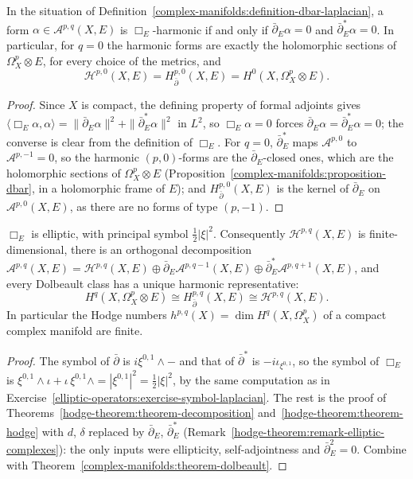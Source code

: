 \begin{lemma}\label{complex-manifolds:lemma-harmonic-closed}
In the situation of Definition~\ref{complex-manifolds:definition-dbar-laplacian}, a form $\alpha \in \mathcal{A}^{p,q}(X, E)$ is $\Box_E$-harmonic if and only if $\bar\partial_E\alpha = 0$ and $\bar\partial_E^*\alpha = 0$. In
particular, for $q = 0$ the harmonic forms are exactly the holomorphic sections of $\Omega^p_X \otimes E$, for every choice of the metrics, and
\[
\mathcal{H}^{p,0}(X, E) = H^{p,0}_{\bar\partial}(X, E) = H^0(X, \Omega^p_X \otimes E).
\]
\end{lemma}

\begin{proof}
Since $X$ is compact, the defining property of formal adjoints gives $\langle\Box_E\alpha, \alpha\rangle = \|\bar\partial_E\alpha\|^2 + \|\bar\partial_E^*\alpha\|^2$ in $L^2$, so $\Box_E\alpha = 0$ forces
$\bar\partial_E\alpha = \bar\partial_E^*\alpha = 0$; the converse is clear from the definition of $\Box_E$. For $q = 0$, $\bar\partial_E^*$ maps $\mathcal{A}^{p,0}$ to $\mathcal{A}^{p,-1} = 0$, so the harmonic
$(p,0)$-forms are the $\bar\partial_E$-closed ones, which are the holomorphic sections of $\Omega^p_X \otimes E$ (Proposition~\ref{complex-manifolds:proposition-dbar}, in a holomorphic frame of $E$); and
$H^{p,0}_{\bar\partial}(X, E)$ is the kernel of $\bar\partial_E$ on $\mathcal{A}^{p,0}(X, E)$, as there are no forms of type $(p,-1)$.
\end{proof}

\begin{theorem}\label{complex-manifolds:theorem-dbar-hodge}
$\Box_E$ is elliptic, with principal symbol $\frac12|\xi|^2$. Consequently $\mathcal{H}^{p,q}(X, E)$ is finite-dimensional, there is an orthogonal decomposition
$\mathcal{A}^{p,q}(X, E) = \mathcal{H}^{p,q}(X, E) \oplus \bar\partial_E\mathcal{A}^{p,q-1}(X, E) \oplus \bar\partial_E^*\mathcal{A}^{p,q+1}(X, E)$, and every Dolbeault class has a unique harmonic
representative:
\[
H^q(X, \Omega^p_X \otimes E) \cong H^{p,q}_{\bar\partial}(X, E) \cong \mathcal{H}^{p,q}(X, E).
\]
In particular the Hodge numbers $h^{p,q}(X) = \dim H^q(X, \Omega^p_X)$ of a compact complex manifold are finite.
\end{theorem}

\begin{proof}
The symbol of $\bar\partial$ is $i\xi^{0,1} \wedge -$ and that of $\bar\partial^*$ is $-i\iota_{\xi^{0,1}}$, so the symbol of $\Box_E$ is $\xi^{0,1} \wedge \iota + \iota\,\xi^{0,1} \wedge = |\xi^{0,1}|^2 = \frac12|\xi|^2$, by the
same computation as in Exercise~\ref{elliptic-operators:exercise-symbol-laplacian}. The rest is the proof of Theorems~\ref{hodge-theorem:theorem-decomposition}
and~\ref{hodge-theorem:theorem-hodge} with $d$, $\delta$ replaced by $\bar\partial_E$, $\bar\partial_E^*$ (Remark~\ref{hodge-theorem:remark-elliptic-complexes}): the only inputs were ellipticity, self-adjointness and
$\bar\partial_E^2 = 0$. Combine with Theorem~\ref{complex-manifolds:theorem-dolbeault}.
\end{proof}

